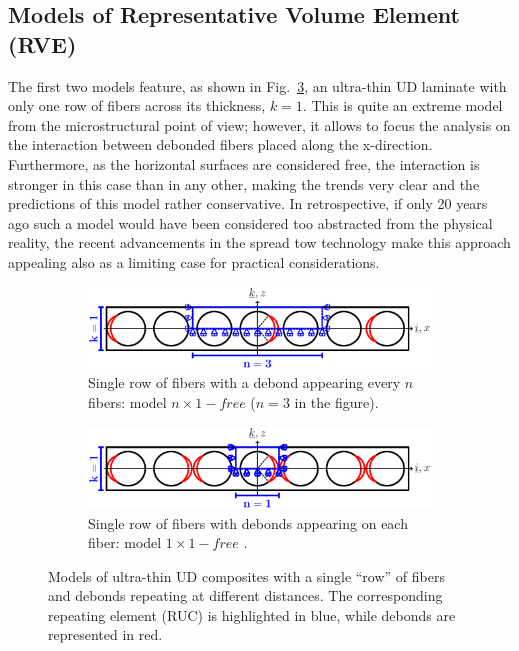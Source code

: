 \documentclass[review]{elsarticle}
\begin{document}
\subsection{Models of Representative Volume Element (RVE)}\label{subsec:rve}

The first two models feature, as shown in Fig.~\ref{fig:laminateModelsA}, an ultra-thin UD laminate with only one row of fibers across its thickness, $k=1$. This is quite an extreme model from the microstructural point of view; however, it allows to focus the analysis on the interaction between debonded fibers placed along the x-direction. Furthermore, as the horizontal surfaces are considered free, the interaction is stronger in this case than in any other, making the trends very clear and the predictions of this model rather conservative. In retrospective, if only 20 years ago such a model would have been considered too abstracted from the physical reality, the recent advancements in the spread tow technology make this approach appealing also as a limiting case for practical considerations.

\begin{figure}[!h]
\centering
    \begin{subfigure}[b]{\textwidth}
        \includegraphics[width=\textwidth]{freeThinPly.pdf}
        \caption{Single row of fibers with a debond appearing every $n$ fibers: model $n\times1-free$ ($n=3$ in the figure).}\label{subfig:freethinply}
    \end{subfigure}

    \begin{subfigure}[b]{\textwidth}
        \includegraphics[width=\textwidth]{freeThinPlyAllDebonds.pdf}
        \caption{Single row of fibers with debonds appearing on each fiber: model $1\times1-free$ .}\label{subfig:freethinplyalldebonds}
    \end{subfigure}

\caption{Models of ultra-thin UD composites with a single ``row'' of fibers and debonds repeating at different distances. The corresponding repeating element (RUC) is highlighted in blue, while debonds are represented in red.}\label{fig:laminateModelsA}
\end{figure}
\end{document}
